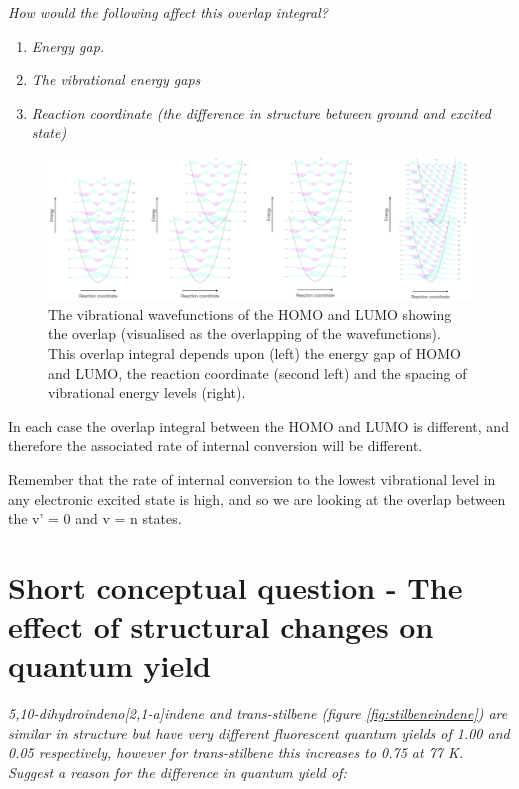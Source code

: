 \documentclass[
]{book}
\begin{document}
\emph{How would the following affect this overlap integral?}

\begin{enumerate}
\def\labelenumi{\arabic{enumi}.}
\item
  \emph{Energy gap.}
\item
  \emph{The vibrational energy gaps}
\item
  \emph{Reaction coordinate (the difference in structure between ground and excited state)}
\end{enumerate}

\begin{figure}

{\centering \includegraphics[width=1\linewidth]{images/intconvoverlap2} 

}

\caption{The vibrational wavefunctions of the HOMO and LUMO showing the overlap (visualised as the overlapping of the wavefunctions). This overlap integral depends upon (left) the energy gap of HOMO and LUMO, the reaction coordinate (second left) and the spacing of vibrational energy levels (right).}\label{fig:overlapans}
\end{figure}

In each case the overlap integral between the HOMO and LUMO is different, and therefore the associated rate of internal conversion will be different.

Remember that the rate of internal conversion to the lowest vibrational level in any electronic excited state is high, and so we are looking at the overlap between the v' = 0 and v = n states.

\hypertarget{sec:structureQY}{%
\section{Short conceptual question - The effect of structural changes on quantum yield}\label{sec:structureQY}}

\emph{5,10-dihydroindeno{[}2,1-a{]}indene and trans-stilbene (figure \ref{fig:stilbeneindene}) are similar in structure but have very different fluorescent quantum yields of 1.00 and 0.05 respectively, however for trans-stilbene this increases to 0.75 at 77 K. Suggest a reason for the difference in quantum yield of:}
\end{document}
